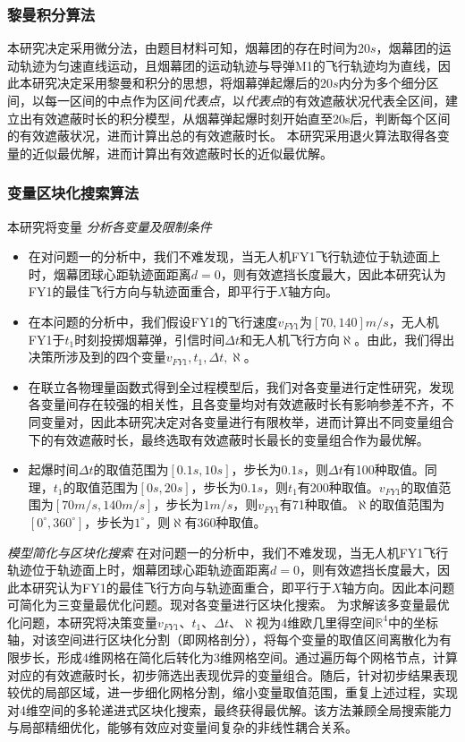 \documentclass{article}
\begin{document}
\subsubsection{黎曼积分算法}
本研究决定采用微分法，由题目材料可知，烟幕团的存在时间为20$s$，烟幕团的运动轨迹为匀速直线运动，且烟幕团的运动轨迹与导弹M1的飞行轨迹均为直线，因此本研究决定采用黎曼和积分的思想，将烟幕弹起爆后的$20s$内分为多个细分区间，以每一区间的中点作为区间\textit{代表点}，以\textit{代表点}的有效遮蔽状况代表全区间，建立出有效遮蔽时长的积分模型，从烟幕弹起爆时刻开始直至20s后，判断每个区间的有效遮蔽状况，进而计算出总的有效遮蔽时长。
本研究采用退火算法取得各变量的近似最优解，进而计算出有效遮蔽时长的近似最优解。

\subsubsection{变量区块化搜索算法}
本研究将变量
\textit{分析各变量及限制条件}
\begin{itemize}
    \item 在对问题一的分析中，我们不难发现，当无人机FY1飞行轨迹位于轨迹面上时，烟幕团球心距轨迹面距离$d=0$，则有效遮挡长度最大，因此本研究认为FY1的最佳飞行方向与轨迹面重合，即平行于$X$轴方向。
    \item 在本问题的分析中，我们假设FY1的飞行速度$v_{FY1}$为$[70,140]m/s$，无人机FY1于$t_1$时刻投掷烟幕弹，引信时间$\Delta t$和无人机飞行方向$\aleph$。由此，我们得出决策所涉及到的四个变量$v_{FY1},t_1,\Delta t,\aleph$。
    \item 在联立各物理量函数式得到全过程模型后，我们对各变量进行定性研究，发现各变量间存在较强的相关性，且各变量均对有效遮蔽时长有影响参差不齐，不同变量对，因此本研究决定对各变量进行有限枚举，进而计算出不同变量组合下的有效遮蔽时长，最终选取有效遮蔽时长最长的变量组合作为最优解。
    \item 起爆时间$\Delta t$的取值范围为$[0.1s,10s]$，步长为$0.1s$，则$\Delta t$有100种取值。同理，$t_1$的取值范围为$[0s,20s]$，步长为$0.1s$，则$t_1$有200种取值。$v_{FY1}$的取值范围为$[70m/s,140m/s]$，步长为$1m/s$，则$v_{FY1}$有71种取值。$\aleph$的取值范围为$[0^\circ,360^\circ]$，步长为$1^\circ$，则$\aleph$有360种取值。
\end{itemize}

\textit{模型简化与区块化搜索}
在对问题一的分析中，我们不难发现，当无人机FY1飞行轨迹位于轨迹面上时，烟幕团球心距轨迹面距离$d=0$，则有效遮挡长度最大，因此本研究认为FY1的最佳飞行方向与轨迹面重合，即平行于$X$轴方向。因此本问题可简化为三变量最优化问题。现对各变量进行区块化搜索。
为求解该多变量最优化问题，本研究将决策变量$v_{FY1}$、$t_1$、$\Delta t$、$\aleph$视为4维欧几里得空间$\mathbb{R}^4$中的坐标轴，对该空间进行区块化分割（即网格剖分），将每个变量的取值区间离散化为有限步长，形成4维网格在简化后转化为3维网格空间。通过遍历每个网格节点，计算对应的有效遮蔽时长，初步筛选出表现优异的变量组合。随后，针对初步结果表现较优的局部区域，进一步细化网格分割，缩小变量取值范围，重复上述过程，实现对4维空间的多轮递进式区块化搜索，最终获得最优解。该方法兼顾全局搜索能力与局部精细优化，能够有效应对变量间复杂的非线性耦合关系。
\end{document}
